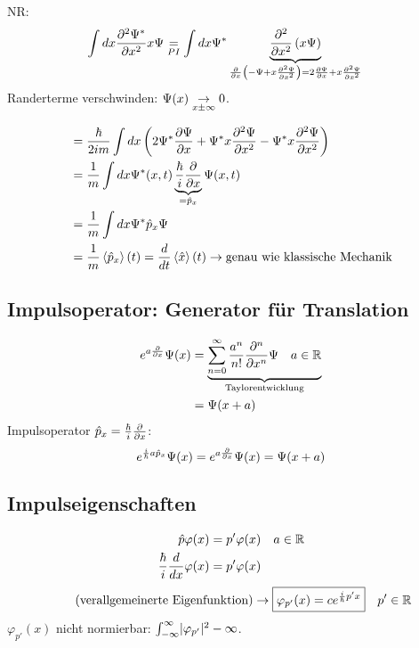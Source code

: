 \begin{eins}{NR:}
     \begin{align*}
         \int dx \frac{\partial^2 \Psi^*}{\partial x^2} x \Psi
         &\underset{PI}{=}
         \int dx \Psi^* 
         \underbrace{ \frac{\partial^2}{\partial x^2}\left( x \Psi \right)}_{\frac{\partial}{\partial x}\left( -
         \Psi + x \frac{\partial^2 \Psi}{\partial x^2}\right)  = 2 \frac{\partial \Psi}{\partial x} + x
         \frac{\partial^2 \Psi}{\partial x^2}}
     \end{align*}
     Randerterme verschwinden: $\Psi(x) \underset{x \pm \infty}{\rightarrow} 0$.
\end{eins}
\begin{align*}
     &=
     \frac{\hbar}{2im} \int dx \left( 2 \Psi^* \frac{\partial\Psi}{\partial x}
     + \Psi^* x \frac{\partial^2 \Psi}{\partial x^2}
     - \Psi^* x \frac{\partial^2 \Psi}{\partial x^2} \right) \\
     &=
     \frac{1}{m} \int dx \Psi^*(x,t) \underbrace{\frac{\hbar}{i} \frac{\partial}{\partial
     x}}_{= \hat{p}_x} \Psi(x,t) \\
     &=
     \frac{1}{m} \int dx \Psi^* \hat{p}_x \Psi \\
     &=
     \frac{1}{m} \left\langle \hat{p}_x \right\rangle (t)
     =
     \frac{d }{d t} \left\langle \hat{x} \right\rangle (t)
     \rightarrow \text{genau wie klassische Mechanik}
\end{align*}
\subsection{Impulsoperator: Generator für Translation} %
\label{sub:Impulsoperator:_Generator_für_Translation}
\begin{align*}
    e^{a \frac{\partial}{\partial x}} \Psi(x)
    &=
    \underbrace{\sum_{n=0}^\infty \frac{a^n}{n!} \frac{\partial^n}{\partial x^n} \Psi \quad a \in
    \mathbb{R}}_{\text{Taylorentwicklung}} \\
    &=
    \Psi(x+a)
\end{align*}
Impulsoperator $\hat{p}_x = \frac{\hbar}{i} \frac{\partial}{\partial x}$:
\begin{equation*}
    e^{\frac{i}{\hbar} a \hat{p}_x} \Psi(x) =
    e^{a \frac{\partial}{\partial x}} \Psi(x) = \Psi(x+a)
\end{equation*}
\subsection{Impulseigenschaften} %
\label{sub:Impulseigenschaften}
\begin{align*}
    \hat{p} \varphi(x) &= p' \varphi(x) \quad a \in \mathbb{R}\\
    \frac{\hbar}{i} \frac{d }{d x} \varphi(x) &= p' \varphi(x) \\
\end{align*}
\begin{equation*}
    \tag*{\text{(verallgemeinerte Eigenfunktion)}}
    \rar
    \boxed{
        \varphi_{p'}(x) = c e^{\frac{i}{\hb} p' x}
    }
    \quad p' \in \mathbb{R} 
\end{equation*}
$\varphi_{p'}(x)$ nicht normierbar: $\int_{-\infty}^{\infty} \lvert \varphi_{p'}
\rvert^2 - \infty$.

